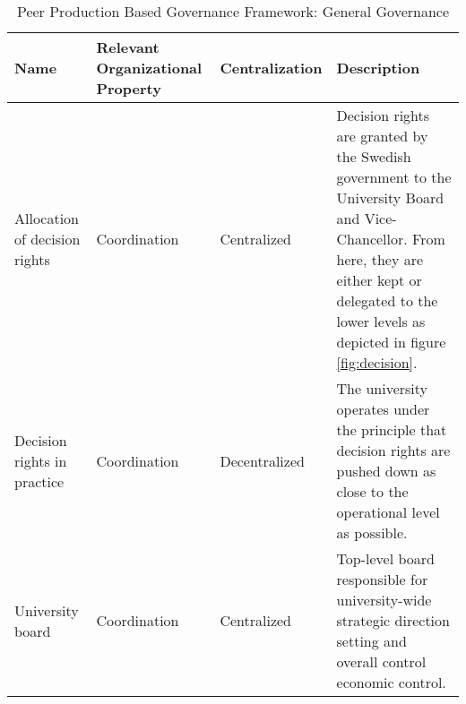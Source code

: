 
\begin{table}[H]
\caption{Peer Production Based Governance Framework: General Governance}
\label{table:peerGeneralGovernance}
\begin{tabular}{ | p{} | p{}| p{} | p{}|}
%
\hline
%
\textbf{Name} & 
\textbf{Relevant Organizational Property} &
\textbf{Centralization} &  
\textbf{Description} \\
%
\hline
%
 Allocation of decision rights & 
 Coordination &
 Centralized & 
 Decision rights are granted by the Swedish government to the University Board and Vice-Chancellor. From here, they are either kept or delegated to the lower levels as depicted in figure \ref{fig:decision}. \\
%
\hline
%
 Decision rights in practice & 
 Coordination &
 Decentralized & 
 The university operates under the principle that decision rights are pushed down as close to the operational level as possible. \\
%
\hline
%
%
%
 University board &
 Coordination &
 Centralized &
 Top-level board responsible for university-wide strategic direction setting and overall control economic control. \\
%
\hline
%
 

\end{tabular}
\end{table}
